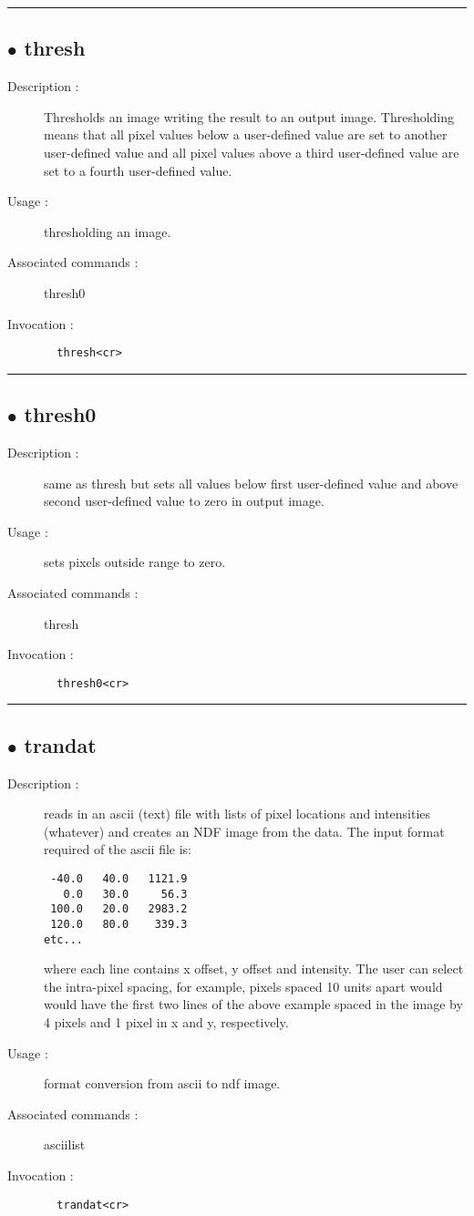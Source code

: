 \hrule \subsection*{$\bullet$ thresh}
\begin{description}
\item[Description :] Thresholds an image writing the result to an output image.
Thresholding means that all pixel values below a user-defined value are
set to another user-defined value and all pixel values above a third
user-defined value are set to a fourth user-defined value.
\item[Usage :] thresholding an image.
\item[Associated commands :] thresh0
\item[Invocation :]

\verb+  thresh<cr> +\end{description}

\hrule \subsection*{$\bullet$ thresh0}
\begin{description}
\item[Description :] same as thresh but sets all values below first user-defined
value and above second user-defined value to zero in output image.
\item[Usage :] sets pixels outside range to zero.
\item[Associated commands :] thresh
\item[Invocation :]

\verb+  thresh0<cr> +\end{description}

\hrule \subsection*{$\bullet$ trandat}
\begin{description}
\item[Description :] reads in an ascii (text) file with lists of pixel locations and 
intensities (whatever) and creates an NDF image from the data.  The input 
format required of the ascii file is:

\begin{verbatim}
 -40.0   40.0   1121.9
   0.0   30.0     56.3
 100.0   20.0   2983.2
 120.0   80.0    339.3     
etc...
\end{verbatim}

where each line contains x offset, y offset and intensity.  The user can
select the intra-pixel spacing, for example, pixels spaced 10 units apart
would would have the first two lines of the above example spaced in the
image by 4 pixels and 1 pixel in x and y, respectively.

\item[Usage :] format conversion from ascii to ndf image.
\item[Associated commands :] asciilist
\item[Invocation :]

\verb+  trandat<cr> +\end{description}

